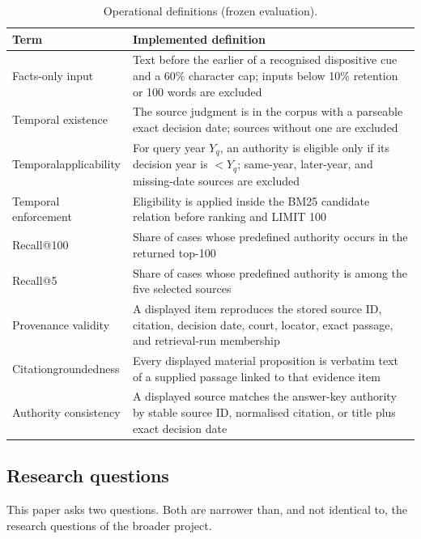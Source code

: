 \documentclass[conference]{IEEEtran}
\begin{document}
\begin{table}[!t]
\caption{Operational definitions (frozen evaluation).}
\label{tab:1}
\centering\footnotesize

\begin{tabular}{|p{}|p{}|}
\hline
\textbf{Term} & \textbf{Implemented definition} \\ \hline
Facts-only input & Text before the earlier of a recognised dispositive cue and a 60\% character cap; inputs below 10\% retention or 100 words are excluded \\ \hline
Temporal existence & The source judgment is in the corpus with a parseable exact decision date; sources without one are excluded \\ \hline
Temporal\newline applicability & For query year $Y_q$, an authority is eligible only if its decision year is $<Y_q$; same-year, later-year, and missing-date sources are excluded \\ \hline
Temporal enforcement & Eligibility is applied inside the BM25 candidate relation before ranking and LIMIT 100 \\ \hline
Recall@100 & Share of cases whose predefined authority occurs in the returned top-100 \\ \hline
Recall@5 & Share of cases whose predefined authority is among the five selected sources \\ \hline
Provenance validity & A displayed item reproduces the stored source ID, citation, decision date, court, locator, exact passage, and retrieval-run membership \\ \hline
Citation\newline groundedness & Every displayed material proposition is verbatim text of a supplied passage linked to that evidence item \\ \hline
Authority consistency & A displayed source matches the answer-key authority by stable source ID, normalised citation, or title plus exact decision date \\ \hline
\end{tabular}
\end{table}

\subsection{Research questions}
This paper asks two questions. Both are narrower than, and not identical to, the research questions of the broader project.
\end{document}
